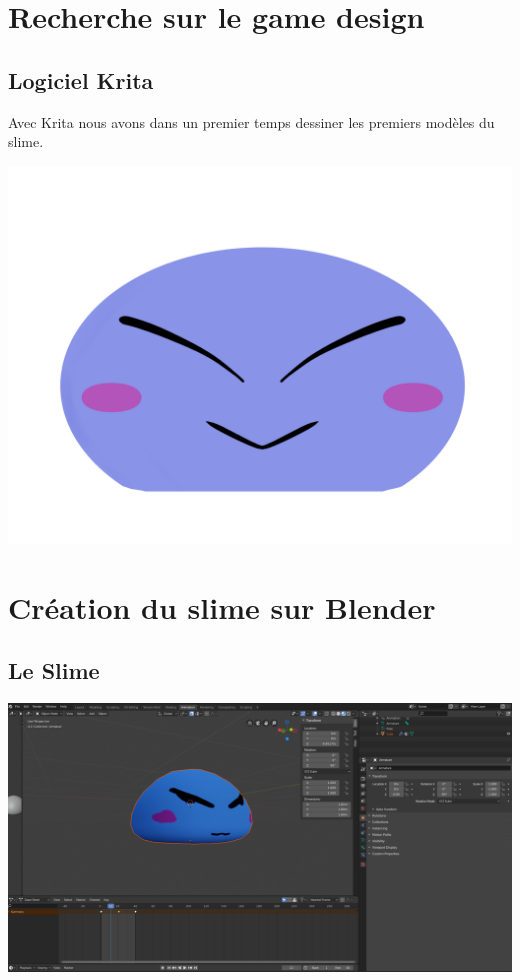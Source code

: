 \documentclass{article}
\begin{document}
\section{Recherche sur le game design }
\subsection{Logiciel Krita}
Avec Krita nous avons dans un premier temps dessiner les premiers modèles du slime.
\begin{center}
  \includegraphics[scale=0.3]{slime01.png}
\end{center}


\section{Création du slime sur Blender}
\subsection{Le Slime}
\begin{center}
  \includegraphics[scale=0.2]{blender.png}
\end{center}
\end{document}
